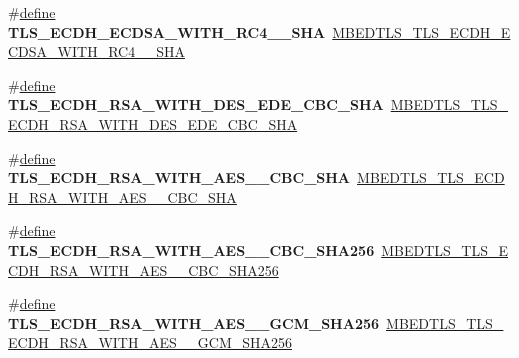 \begin{DoxyCompactItemize}
\item 
\mbox{\label{compat-1_83_8h_a9eee29157ffc25d3935887f5b35b88f7}} 
\#\hyperlink{structdefine}{define} {\bfseries T\+L\+S\+\_\+\+E\+C\+D\+H\+\_\+\+E\+C\+D\+S\+A\+\_\+\+W\+I\+T\+H\+\_\+\+R\+C4\+\_\+\_\+\+S\+HA}~\hyperlink{ssl__ciphersuites_8h_aa46f4ef6ad2c9d60de5900f6b8c13129}{M\+B\+E\+D\+T\+L\+S\+\_\+\+T\+L\+S\+\_\+\+E\+C\+D\+H\+\_\+\+E\+C\+D\+S\+A\+\_\+\+W\+I\+T\+H\+\_\+\+R\+C4\+\_\+\_\+\+S\+HA}
\item 
\mbox{\label{compat-1_83_8h_a89d57fa35a820dd9dec0e39ad8b3144a}} 
\#\hyperlink{structdefine}{define} {\bfseries T\+L\+S\+\_\+\+E\+C\+D\+H\+\_\+\+R\+S\+A\+\_\+\+W\+I\+T\+H\+\_\+D\+E\+S\+\_\+\+E\+D\+E\+\_\+\+C\+B\+C\+\_\+\+S\+HA}~\hyperlink{ssl__ciphersuites_8h_a8ec3be9c63eff67d2c72d036ab727c6b}{M\+B\+E\+D\+T\+L\+S\+\_\+\+T\+L\+S\+\_\+\+E\+C\+D\+H\+\_\+\+R\+S\+A\+\_\+\+W\+I\+T\+H\+\_\+D\+E\+S\+\_\+\+E\+D\+E\+\_\+\+C\+B\+C\+\_\+\+S\+HA}
\item 
\mbox{\label{compat-1_83_8h_aa91806e0632eb2034cade163f96e08b2}} 
\#\hyperlink{structdefine}{define} {\bfseries T\+L\+S\+\_\+\+E\+C\+D\+H\+\_\+\+R\+S\+A\+\_\+\+W\+I\+T\+H\+\_\+\+A\+E\+S\+\_\+\_\+\+C\+B\+C\+\_\+\+S\+HA}~\hyperlink{ssl__ciphersuites_8h_a843c783ca0e8255e290afbd35e83ba92}{M\+B\+E\+D\+T\+L\+S\+\_\+\+T\+L\+S\+\_\+\+E\+C\+D\+H\+\_\+\+R\+S\+A\+\_\+\+W\+I\+T\+H\+\_\+\+A\+E\+S\+\_\+\_\+\+C\+B\+C\+\_\+\+S\+HA}
\item 
\mbox{\label{compat-1_83_8h_a5f88bf757bb85ecfe28fd5264e2721a8}} 
\#\hyperlink{structdefine}{define} {\bfseries T\+L\+S\+\_\+\+E\+C\+D\+H\+\_\+\+R\+S\+A\+\_\+\+W\+I\+T\+H\+\_\+\+A\+E\+S\+\_\+\_\+\+C\+B\+C\+\_\+\+S\+H\+A256}~\hyperlink{ssl__ciphersuites_8h_a01aeb5655adae861d06739d10fe141b3}{M\+B\+E\+D\+T\+L\+S\+\_\+\+T\+L\+S\+\_\+\+E\+C\+D\+H\+\_\+\+R\+S\+A\+\_\+\+W\+I\+T\+H\+\_\+\+A\+E\+S\+\_\+\_\+\+C\+B\+C\+\_\+\+S\+H\+A256}
\item 
\mbox{\label{compat-1_83_8h_a616422519509b4a667e98a1e4dbfebc8}} 
\#\hyperlink{structdefine}{define} {\bfseries T\+L\+S\+\_\+\+E\+C\+D\+H\+\_\+\+R\+S\+A\+\_\+\+W\+I\+T\+H\+\_\+\+A\+E\+S\+\_\+\_\+\+G\+C\+M\+\_\+\+S\+H\+A256}~\hyperlink{ssl__ciphersuites_8h_a44278d5b600a19e7257a4d6d4c3fcc3c}{M\+B\+E\+D\+T\+L\+S\+\_\+\+T\+L\+S\+\_\+\+E\+C\+D\+H\+\_\+\+R\+S\+A\+\_\+\+W\+I\+T\+H\+\_\+\+A\+E\+S\+\_\+\_\+\+G\+C\+M\+\_\+\+S\+H\+A256}

\end{DoxyCompactItemize}
